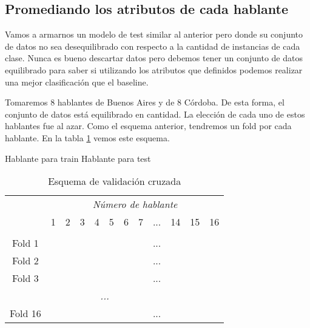 \subsection{Promediando los atributos de cada hablante}
\label{prom_los_atributos_de_cada_hablante}

Vamos a armarnos un modelo de test similar al anterior pero donde su conjunto de datos no sea desequilibrado con respecto a la cantidad de instancias de cada clase. Nunca es bueno descartar datos pero debemos tener un conjunto de datos equilibrado para saber si utilizando los atributos que definidos podemos realizar una mejor clasificación que el baseline.

Tomaremos 8 hablantes de Buenos Aires y de 8 Córdoba. De esta forma, el conjunto de datos está equilibrado en cantidad. La elección de cada uno de estos hablantes fue al azar. Como el esquema anterior, tendremos un fold por cada hablante. En la tabla \ref{PAH_esq_cv} vemos este esquema.

\begin{center}
	\mycirc[blue] Hablante para train \mycirc[red] Hablante para test
\end{center}

\begin{table}[H]
	\centering
	\begin{tabular}{cccccccccccc}
		& \multicolumn{11}{c}{\textit{Número de hablante}} \\
		& 1 & 2 & 3 & 4 & 5 & 6 & 7 & ... & 14 & 15 & 16 \\
		\hline \\
		Fold 1 &\mycirc[red] & \mycirc[blue] & \mycirc[blue]  & \mycirc[blue]  & \mycirc[blue]  & \mycirc[blue]  & \mycirc[blue] & ... & \mycirc[blue] & \mycirc[blue] & \mycirc[blue]  \\
		
		Fold 2 &\mycirc[blue] & \mycirc[red] & \mycirc[blue]  & \mycirc[blue]  & \mycirc[blue]  & \mycirc[blue]  & \mycirc[blue] & ... & \mycirc[blue] & \mycirc[blue] & \mycirc[blue]  \\
		
		Fold 3 &\mycirc[blue] & \mycirc[blue] & \mycirc[red]  & \mycirc[blue]  & \mycirc[blue]  & \mycirc[blue]  & \mycirc[blue] & ... & \mycirc[blue] & \mycirc[blue] & \mycirc[blue]  \\
		
		\multicolumn{11}{c}{\textit{...}}	\\
		
		Fold 16 &\mycirc[blue] & \mycirc[blue] & \mycirc[blue]  & \mycirc[blue]  & \mycirc[blue]  & \mycirc[blue]  & \mycirc[blue] & ... & \mycirc[blue] & \mycirc[blue] & \mycirc[red]   \\
		
	\end{tabular}
	\caption{Esquema de validación cruzada}
	\label{PAH_esq_cv}
\end{table}

